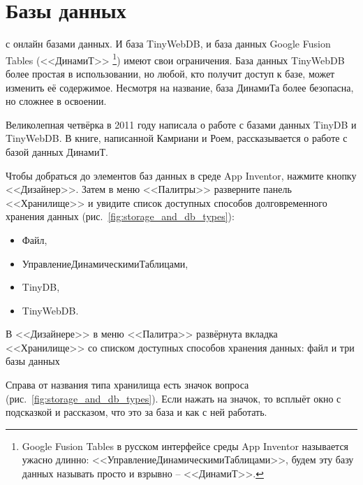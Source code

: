 \chapter{Базы данных}
\label{ch:databases}

 с онлайн базами данных. 
И база TinyWebDB, и база данных 
Google Fusion Tables (<<ДинамиТ>>%
\footnote[][-1.0cm]{
        Google Fusion Tables в русском интерфейсе среды App Inventor называется 
        ужасно длинно: <<УправлениеДинамическимиТаблицами>>, 
        будем эту базу данных называть просто и взрывно -- <<ДинамиТ>>. 
}) имеют свои ограничения.
База данных TinyWebDB более простая в использовании, 
но любой, кто получит доступ к базе, может изменить её содержимое. 
Несмотря на название, база ДинамиТа более безопасна, но сложнее в освоении. 

Великолепная четвёрка в 2011 году написала о работе с базами данных 
TinyDB и TinyWebDB\cite{Giesemann2020}. 
В книге, написанной Камриани и Роем\cite{KamrianiAndRoy2016}, 
рассказывается о работе с базой данных ДинамиТ. 

Чтобы добраться до элементов баз данных в среде App Inventor, 
нажмите кнопку <<Дизайнер>>. 
Затем в меню <<Палитры>> разверните панель <<Хранилище>> и увидите 
список доступных способов долговременного хранения данных (рис.~\ref{fig:storage_and_db_types}): 
\begin{itemize}
    \item Файл,
    \item УправлениеДинамическимиТаблицами,
    \item TinyDB,
    \item TinyWebDB.
\end{itemize}

\begin{marginfigure}[0.3cm]
{%
\setlength{\fboxsep}{0pt}%
\setlength{\fboxrule}{1pt}%
%
}%
    \caption{В <<Дизайнере>> в меню <<Палитра>> развёрнута вкладка <<Хранилище>> 
    со списком доступных способов хранения данных: файл и три базы данных}
\label{fig:storage_and_db_types}
\end{marginfigure}

Справа от названия типа хранилища есть значок вопроса (рис.~\ref{fig:storage_and_db_types}). 
Если нажать на значок, то всплыёт окно с подсказкой и рассказом, 
что это за база и как с ней работать.

